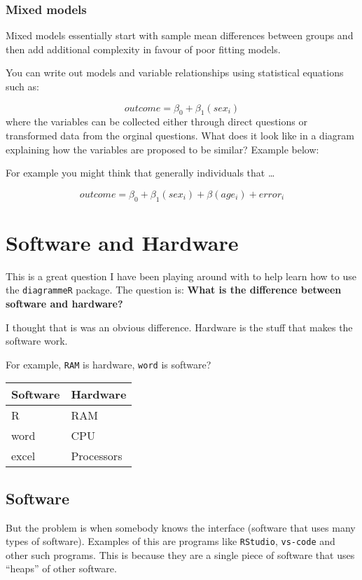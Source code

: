 \documentclass[]{book}
\begin{document}
\hypertarget{mixed-models}{%
\subsection{Mixed models}\label{mixed-models}}

Mixed models essentially start with sample mean differences between groups and then add additional complexity in favour of poor fitting models.

You can write out models and variable relationships using statistical equations such as:

\[ outcome = \beta_0 + \beta_1(sex_i)\]
where the variables can be collected either through direct questions or transformed data from the orginal questions. What does it look like in a diagram explaining how the variables are proposed to be similar? Example below:

For example you might think that generally individuals that \ldots{}

\[ outcome = \beta_0 + \beta_1(sex_i) + \beta(age_i) + error_i \]

\hypertarget{comps}{%
\chapter{Software and Hardware}\label{comps}}

This is a great question I have been playing around with to help learn how to use the \texttt{diagrammeR} package. The question is:
\textbf{What is the difference between software and hardware?}

I thought that is was an obvious difference. Hardware is the stuff that makes the software work.

For example, \texttt{RAM} is hardware, \texttt{word} is software?

\begin{longtable}[]{@{}ll@{}}
\toprule
Software & Hardware\tabularnewline
\midrule
\endhead
R & RAM\tabularnewline
word & CPU\tabularnewline
excel & Processors\tabularnewline
\bottomrule
\end{longtable}

\hypertarget{software}{%
\section{Software}\label{software}}

But the problem is when somebody knows the interface (software that uses many types of software). Examples of this are programs like \texttt{RStudio}, \texttt{vs-code} and other such programs. This is because they are a single piece of software that uses ``heaps'' of other software.
\end{document}
